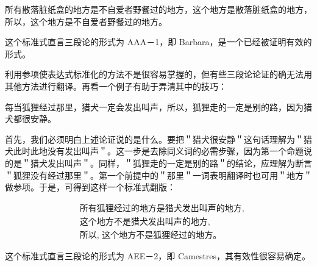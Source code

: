 所有散落脏纸盒的地方是不自爱者野餐过的地方，这个地方是散落脏纸盒的地方，所以，这个地方是不自爱者野餐过的地方。

这个标准式直言三段论的形式为 AAA－1，即 Barbara，是一个已经被证明有效的形式。

利用参项使表达式标准化的方法不是很容易掌握的，但有些三段论论证的确无法用其他方法进行翻译。再看一个例子有助于弄清其中的技巧：

每当狐狸经过那里，猎犬一定会发出叫声，所以，狐狸走的一定是别的路，因为猎犬都很安静。

首先，我们必须明白上述论证说的是什么。要把＂猎犬很安静＂这句话理解为＂猎犬此时此地没有发出叫声＂。这一步是去除同义词的必需步骤，因为第一个命题说的是＂猎犬发出叫声＂。同样，＂狐狸走的一定是别的路＂的结论，应理解为断言＂狐狸没有经过那里＂。第一个前提中的＂那里＂一词表明翻译时也可用＂地方＂做参项。于是，可得到这样一个标准式翻版：

$$
\begin{aligned}
& \text { 所有狐狸经过的地方是猎犬发出叫声的地方, } \\
& \text { 这个地方不是猎犬发出叫声的地方, } \\
& \text { 所以, 这个地方不是狐狸经过的地方。 }
\end{aligned}
$$

这个标准式直言三段论的形式为 AEE－2，即 Camestres，其有效性很容易确定。 
